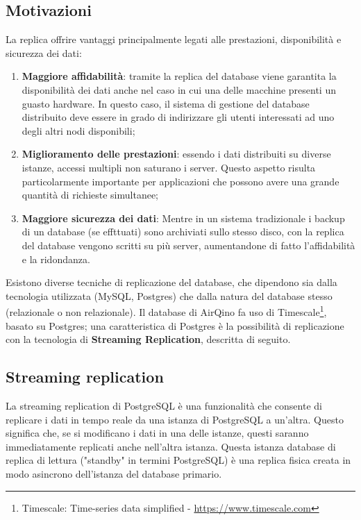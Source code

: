 \subsection{Motivazioni}\label{ssec:replica-motivazioni}
La replica offrire vantaggi principalmente legati alle prestazioni, disponibilità e sicurezza dei dati:
\begin{enumerate}
  \item \textbf{Maggiore affidabilità}: tramite la replica del database viene garantita la disponibilità dei dati anche nel caso in cui una delle macchine presenti un guasto hardware. In questo caso, il sistema di gestione del database distribuito deve essere in grado di indirizzare gli utenti interessati ad uno degli altri nodi disponibili;
  \item \textbf{Miglioramento delle prestazioni}: essendo i dati distribuiti su diverse istanze, accessi multipli non saturano i server. Questo aspetto risulta particolarmente importante per applicazioni che possono avere una grande quantità di richieste simultanee;
  \item \textbf{Maggiore sicurezza dei dati}: Mentre in un sistema tradizionale i backup di un database (se effttuati) sono archiviati sullo stesso disco, con la replica del database vengono scritti su più server, aumentandone di fatto l'affidabilità e la ridondanza.
\end{enumerate}

Esistono diverse tecniche di replicazione del database, che dipendono sia dalla tecnologia utilizzata (MySQL, Postgres) che dalla natura del database stesso (relazionale o non relazionale). Il database di AirQino fa uso di Timescale\footnote{Timescale: Time-series data simplified - \url{https://www.timescale.com}}, basato su Postgres; una caratteristica di Postgres è la possibilità di replicazione con la tecnologia di \textbf{Streaming Replication}, descritta di seguito.

\subsection{Streaming replication}\label{ssec:streaming-replication}
La streaming replication di PostgreSQL è una funzionalità che consente di replicare i dati in tempo reale da una istanza di PostgreSQL a un'altra. Questo significa che, se si modificano i dati in una delle istanze, questi saranno immediatamente replicati anche nell'altra istanza. Questa istanza database di replica di lettura ("standby" in termini PostgreSQL) è una replica fisica creata in modo asincrono dell'istanza del database primario.

